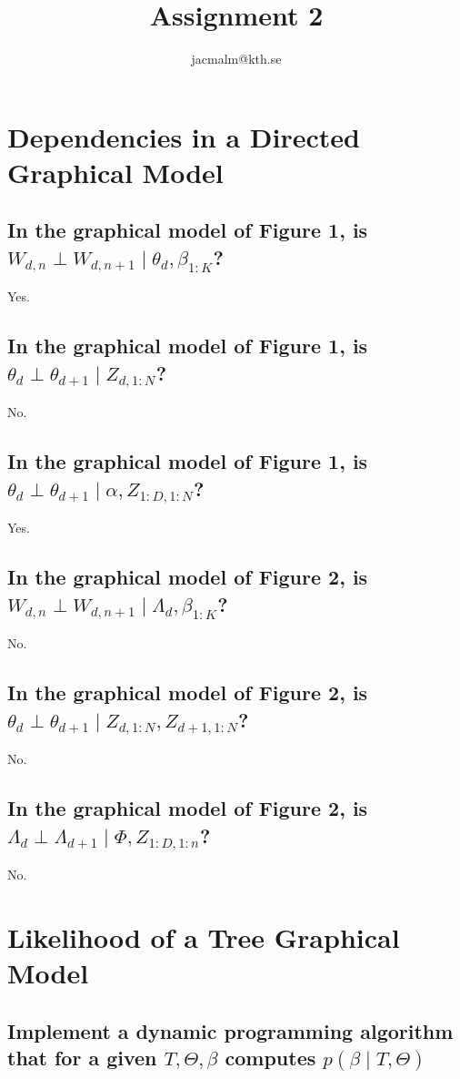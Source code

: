 \documentclass[11pt,a4paper]{article}
\author{jacmalm@kth.se}
\title{Assignment 2}
\begin{document}
\section{Dependencies in a Directed Graphical Model}
\subsection{In the graphical model of Figure 1, is $W_{d, n} \perp W_{d,n+1} \mid \theta_{d}, \beta_{1:K}$?}
	Yes.
	
\subsection{In the graphical model of Figure 1, is $ \theta_{d} \perp \theta_{d+1} \mid Z_{d, 1:N}$?}

No.

\subsection{In the graphical model of Figure 1, is $ \theta_{d} \perp \theta_{d+1} \mid \alpha, Z_{1:D, 1:N}$?}

Yes.

\subsection{In the graphical model of Figure 2, is $ W_{d, n} \perp W_{d,n+1} \mid \Lambda_{d}, \beta_{1:K} $?}

No.

\subsection{In the graphical model of Figure 2, is $ \theta_{d} \perp \theta_{d+1} \mid Z_{d, 1:N}, Z_{d+1, 1:N}$?}

No.

\subsection{In the graphical model of Figure 2, is $ \Lambda_{d} \perp \Lambda_{d + 1} \mid \Phi, Z_{1:D, 1:n}$?}

No.

\section{Likelihood of a Tree Graphical Model}

\subsection{Implement a dynamic programming algorithm that for a given $T, \Theta, \beta$ computes $p(\beta \mid T, \Theta)$}
\end{document}
